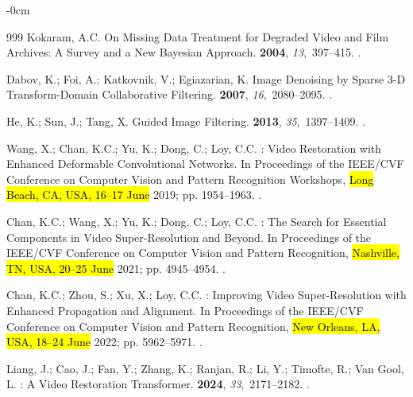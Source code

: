 \documentclass[symmetry,article,accept,pdftex,moreauthors]{Definitions/mdpi}
\begin{document}
\begin{adjustwidth}{-\extralength}{0cm}
\begin{thebibliography}{999}
Kokaram, A.C.
\newblock On Missing Data Treatment for Degraded Video and Film Archives: {A}
  Survey and a New {Bayesian} Approach.
 {\bf 2004}, {\em
  13},~397--415.
.

Dabov, K.; Foi, A.; Katkovnik, V.; Egiazarian, K.
\newblock Image Denoising by Sparse {3-D} Transform-Domain Collaborative
  Filtering.
 {\bf 2007}, {\em
  16},~2080--2095.
.

He, K.; Sun, J.; Tang, X.
\newblock Guided Image Filtering.
  {\bf 2013}, {\em 35},~1397--1409.
.

Wang, X.; Chan, K.C.; Yu, K.; Dong, C.; Loy, C.C.
: Video Restoration with Enhanced Deformable Convolutional
  Networks.
\newblock In Proceedings of the IEEE/CVF Conference on
  Computer Vision and Pattern Recognition Workshops, \hl{Long Beach, CA, USA, 16--17 June} 2019; pp. 1954--1963.
.

Chan, K.C.; Wang, X.; Yu, K.; Dong, C.; Loy, C.C.
: The Search for Essential Components in Video
  Super-Resolution and Beyond.
\newblock In Proceedings of the IEEE/CVF Conference on
  Computer Vision and Pattern Recognition, \hl{Nashville, TN, USA, 20--25 June} 2021; pp. 4945--4954.
.

Chan, K.C.; Zhou, S.; Xu, X.; Loy, C.C.
: Improving Video Super-Resolution with Enhanced
  Propagation and Alignment.
\newblock In Proceedings of the IEEE/CVF Conference on
  Computer Vision and Pattern Recognition, \hl{New Orleans, LA, USA, 18--24 June} 2022; pp. 5962--5971.
.

Liang, J.; Cao, J.; Fan, Y.; Zhang, K.; Ranjan, R.; Li, Y.; Timofte, R.; {Van
  Gool}, L.
: A Video Restoration Transformer.
 {\bf 2024}, {\em
  33},~2171--2182.
.


\end{thebibliography}
\end{adjustwidth}
\end{document}

